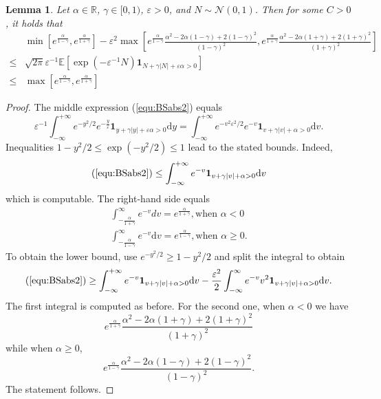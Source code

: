 \documentclass[11pt]{article}
\theoremstyle{plain}
\newtheorem{lemma}[theorem]{Lemma}
\theoremstyle{definition}
\theoremstyle{remark}
\newcommand{\R}{\mathbb{R}}
\newcommand{\dd}{\mathrm{d}}
\newcommand{\cN}{\mathcal{N}}
\newcommand{\1}{\mathbf{1}}
\numberwithin{equation}{section}
\def\eps{\varepsilon}
\begin{document}
\begin{lemma} \label{lem:BSabs}
Let  $\alpha \in \R$, $\gamma \in [0,1)$, $\varepsilon>0$, and $N \sim \cN(0,1)$. 
Then for some $C>0$, it holds that
\begin{align} \label{equ:BSabs}
  & \min\left[ e^{\frac{\alpha}{1-\gamma}},e^{\frac{\alpha}{1+\gamma}}\right] - \varepsilon^2 
\max\left[ e^{\frac{\alpha}{1-\gamma}}
\frac{\alpha^2-2\alpha(1-\gamma)+2(1-\gamma)^2}{(1-\gamma)^2}
,e^{\frac{\alpha}{1+\gamma}}
\frac{\alpha^2-2\alpha(1+\gamma)+2(1+\gamma)^2}{(1+\gamma)^2}
\right] \\
\label{equ:BSabs2}
  \leq  &\sqrt{2\pi} \varepsilon^{-1} \mathbb{E }\left[ \exp\left( -\varepsilon^{-1} N\right) \1_{ N + \gamma |N| + \varepsilon \alpha >0 }\right]  \\
  \label{equ:BSabs3}
 \leq  &   \max\left[ e^{\frac{\alpha}{1-\gamma}},e^{\frac{\alpha}{1+\gamma}}\right]
\end{align}
\end{lemma}

\begin{proof}
The middle expression (\ref{equ:BSabs2}) equals
$$
     \varepsilon^{-1}  \int_{-\infty}^{+\infty}  e^{-y^2/2} e^{-\frac{y}{\varepsilon}} \1_{y + \gamma |y| + \varepsilon \alpha>0} \dd y 
=   \int_{-\infty}^{+\infty}   e^{-v^2 \eps^2 /2}  e^{-v} \1_{v + \gamma | v| +  \alpha>0} \dd v.
$$
Inequalities $1 - y^2/2 \le \exp(-y^2/2) \le 1$ lead to the stated bounds. Indeed,
$$
           \text{(\ref{equ:BSabs2})} \leq   \int_{-\infty}^{+\infty}   e^{-v} \1_{v + \gamma | v| +  \alpha>0} \dd v
$$
which is computable. The right-hand side equals
\[
\begin{split}
\int_{-\frac{\alpha}{1+\gamma}}^{\infty} e^{-v} dv = e^{\frac{\alpha}{1 +\gamma}}, 
\mbox{
when } \alpha < 0 \\
\int_{-\frac{\alpha}{1-\gamma}}^{\infty}   e^{-v} \dd v 
= e^{\frac{\alpha}{1-\gamma}},
\mbox{
when }\alpha \geq 0.
\end{split}
\]
To obtain the lower bound, use $e^{-y^2/2} \geq 1 - y^2/2$ and split the integral to obtain
\[
 \text{(\ref{equ:BSabs2})} 
\geq   \int_{-\infty}^{+\infty}   e^{-v} \1_{v + \gamma | v| +  \alpha>0} \dd v  
- \frac{\varepsilon^{2}}{2} \int_{-\infty}^\infty e^{-v} v^2 \1_{v + \gamma | v| +  \alpha>0} \dd v.
\] 
The first integral is computed as before. For the second one, when $\alpha < 0$ we have
\[
e^{\frac{\alpha}{1+\gamma}}
\frac{\alpha^2-2\alpha(1+\gamma)+2(1+\gamma)^2}{(1+\gamma)^2}
\]
while  when $\alpha \geq 0$,
\[
e^{\frac{\alpha}{1-\gamma}}
\frac{\alpha^2-2\alpha(1-\gamma)+2(1-\gamma)^2}{(1-\gamma)^2}.
\]
The statement follows.
\end{proof}
\end{document}
